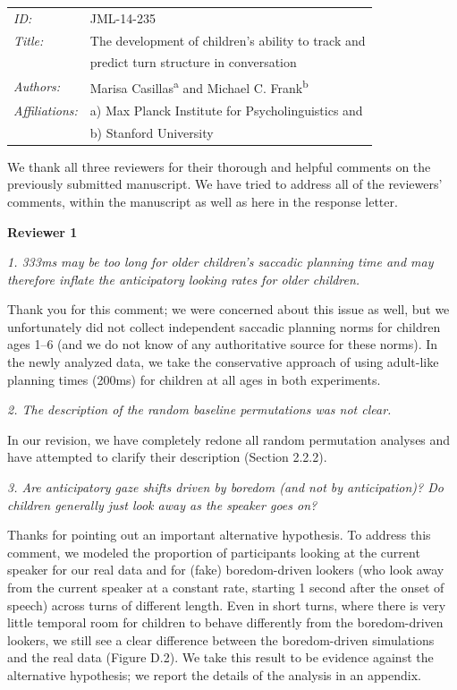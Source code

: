 \documentclass[11pt,a4paper]{letter} %
\begin{document}
\begin{letter}{}
\begin{tabular}{ll}
\textit{ID:} & JML-14-235 \\
\textit{Title:} & The development of children's ability to track and \\
& predict turn structure in conversation \\
\textit{Authors:} & Marisa Casillas\textsuperscript{a} and Michael C. Frank\textsuperscript{b} \\
\textit{Affiliations:} & a) Max Planck Institute for Psycholinguistics and \\
& b) Stanford University
\end{tabular}

\newpage

\noindent We thank all three reviewers for their thorough and helpful comments on the previously submitted manuscript. We have tried to address all of the reviewers' comments, within the manuscript as well as here in the response letter.

\medskip

\noindent \textbf{Reviewer 1}

\noindent \textit{1. 333ms may be too long for older children's saccadic planning time and may therefore inflate the anticipatory looking rates for older children.}

\noindent Thank you for this comment; we were concerned about this issue as well, but we unfortunately did not collect independent saccadic planning norms for children ages 1--6 (and we do not know of any authoritative source for these norms). In the newly analyzed data, we take the conservative approach of using adult-like planning times (200ms) for children at all ages in both experiments.

\smallskip

\noindent \textit{2. The description of the random baseline permutations was not clear.}

\noindent In our revision, we have completely redone all random permutation analyses and have attempted to clarify their description (Section 2.2.2).

\smallskip

\noindent \textit{3. Are anticipatory gaze shifts driven by boredom (and not by anticipation)? Do children generally just look away as the speaker goes on?}

\noindent Thanks for pointing out an important alternative hypothesis. To address this comment, we modeled the proportion of participants looking at the current speaker for our real data and for (fake) boredom-driven lookers (who look away from the current speaker at a constant rate, starting 1 second after the onset of speech) across turns of different length. Even in short turns, where there is very little temporal room for children to behave differently from the boredom-driven lookers, we still see a clear difference between the boredom-driven simulations and the real data (Figure D.2). We take this result to be evidence against the alternative hypothesis; we report the details of the analysis in an appendix.


\end{letter}
\end{document}
